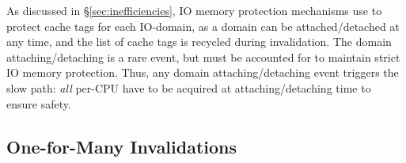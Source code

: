 

As discussed in \S\ref{sec:inefficiencies}, IO memory protection mechanisms 
    use  to protect cache tags for each IO-domain, as
    a domain can be attached/detached at any time, and the list of cache tags is recycled during invalidation.
The domain attaching/detaching is a rare event, but must be accounted for to maintain strict IO memory protection. 
Thus, any domain attaching/detaching event triggers the slow path: \emph{all} per-CPU  
    have to be acquired at attaching/detaching time to ensure safety.

\subsection{One-for-Many Invalidations}
\label{ssec:one-to-many}

